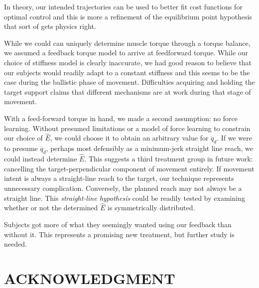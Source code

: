 \documentclass[letterpaper, 10 pt, conference]{ieeeconf}  %
\begin{document}
In theory, our intended trajectories can be used to better fit cost functions for optimal control and this is more a refinement of the equilibrium point hypothesis that sort of gets physics right.


While we could can uniquely determine muscle torque through a torque balance, we assumed a feedback torque model to arrive at feedforward torque. While our choice of stiffness model is clearly inaccurate, we had good reason to believe that our subjects would readily adapt to a constant stiffness and this seems to be the case during the ballistic phase of movement. Difficulties acquiring and holding the target support claims that different mechanisms are at work during that stage of movement\cite{shapiro}.

With a feed-forward torque in hand, we made a second assumption: no force learning.  Without presumed limitations or a model of force learning to constrain our choice of $\hat{E}$, we could choose it to obtain an arbitrary value for $\ddot{q}_d$. If we were to presume $\ddot{q}_d$, perhaps most defensibly as a minimum-jerk straight line reach\cite{flash1985coordination}, we could instead determine $\hat{E}$. This suggests a third treatment group in future work: cancelling the target-perpendicular component of movement entirely. If movement intent is always a straight-line reach to the target, our technique represents unnecessary complication. Conversely, the planned reach may not always be a straight line. This \textit{straight-line hypothesis} could be readily tested by examining whether or not the determined $\hat{E}$ is symmetrically distributed.

Subjects got more of what they seemingly wanted using our feedback than without it. This represents a promising new treatment, but further study is needed.


\section*{ACKNOWLEDGMENT}





\end{document}
